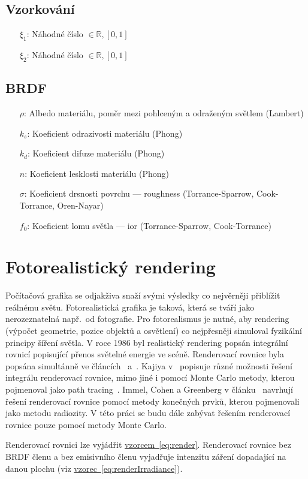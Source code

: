 \documentclass[czech,master]{diploma}
\newcommand{\interval}[1]{\left[{#1}\right]}
\newcommand{\randU}{\xi_{1}}
\newcommand{\randV}{\xi_{2}}
\newcommand{\alb}{\rho}
\newcommand{\rough}{\sigma}
\newcommand{\ior}{f_0}
\begin{document}
\section{Vzorkování}

\begin{itemize}
  \item[\(\randU\):] Náhodné číslo \(\in \mathbb{R}, \interval{0,1}\)
  \item[\(\randV\):] Náhodné číslo \(\in \mathbb{R}, \interval{0,1}\)
\end{itemize}

\section{BRDF}

\begin{itemize}
  \item[\(\alb\):] Albedo materiálu, poměr mezi pohlceným a odraženým světlem (Lambert)
  \item[\(k_s\):] Koeficient odrazivosti materiálu (Phong)
  \item[\(k_d\):] Koeficient difuze materiálu (Phong)
  \item[\(n\):] Koeficient lesklosti materiálu (Phong)
  \item[\(\rough\):] Koeficient drsnosti povrchu --- roughness (Torrance-Sparrow, Cook-Torrance, Oren-Nayar)
  \item[\(\ior\):] Koeficient lomu světla --- ior (Torrance-Sparrow, Cook-Torrance)
\end{itemize}

\clearpage
\chapter{Fotorealistický rendering}
Počítačová grafika se odjakživa snaží svými výsledky co nejvěrněji přiblížit reálnému světu. Fotorealistická grafika je taková, která se tváří jako nerozeznatelná např.\ od fotografie. Pro fotorealismus je nutné, aby rendering (výpočet geometrie, pozice objektů a osvětlení) co nejpřesněji simuloval fyzikální principy šíření světla. V roce 1986 byl realistický rendering popsán integrální rovnicí popisující přenos světelné energie ve scéně. Renderovací rovnice byla popsána simultánně ve článcích~\cite{KajiyaRenderEq} a~\cite{ImmelRenderEq}. Kajiya v~\cite{KajiyaRenderEq} popisuje různé možnosti řešení integrálu renderovací rovnice, mimo jiné i pomocí Monte Carlo metody, kterou pojmenoval jako path tracing~\cite{HainesRayTracingGems2019}. Immel, Cohen a Greenberg v článku~\cite{ImmelRenderEq} navrhují řešení renderovací rovnice pomocí metody konečných prvků, kterou pojmenovali jako metodu radiozity. V této práci se budu dále zabývat řešením renderovací rovnice pouze pomocí metody Monte Carlo. \par
Renderovací rovnici lze vyjádřit \hyperref[eq:render]{vzorcem~\ref{eq:render}}. Renderovací rovnice bez BRDF členu a bez emisivního členu vyjadřuje intenzitu záření dopadající na danou plochu (viz \hyperref[eq:renderIrradiance]{vzorec~\ref{eq:renderIrradiance}})\cite{Dutre2003GICompendum}.
\end{document}
